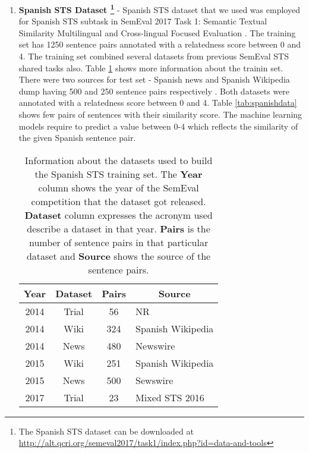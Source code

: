 \begin{enumerate}
\item{ \textbf{Spanish STS Dataset \footnote{The Spanish STS dataset can be downloaded at \url{http://alt.qcri.org/semeval2017/task1/index.php?id=data-and-tools}}}} - Spanish STS dataset that we used was employed for Spanish STS subtask in SemEval 2017 Task 1: Semantic Textual Similarity Multilingual and Cross-lingual Focused Evaluation \cite{cer-etal-2017-semeval}. The training set has 1250 sentence pairs annotated with a relatedness score between 0 and 4. The training set combined several datasets from previous SemEval STS shared tasks also\cite{cer-etal-2017-semeval}. Table \ref{tab:spanishdata_info} shows more information about the trainin set. There were two sources for test set - Spanish news and Spanish Wikipedia dump having 500 and 250 sentence pairs respectively \cite{cer-etal-2017-semeval}. Both datasets were annotated with a relatedness score between 0 and 4. Table \ref{tab:spanishdata} shows few pairs of sentences with their similarity score. The machine learning models require to predict a value between 0-4 which reflects the similarity of the given Spanish sentence pair.

\begin{table}[ht!]
	\centering
	\begin{tabular}{c|c|c|l}
		\hline
		\multicolumn{1}{c|}{\textbf{Year}} & 
		\multicolumn{1}{c|}{\textbf{Dataset}} & 
		\multicolumn{1}{c|}{\textbf{Pairs}} & 
		\multicolumn{1}{c}{\textbf{Source}} \\
		\hline
		2014 \cite{agirre-etal-2014-semeval} & Trial & 56 & NR \\
		2014 \cite{agirre-etal-2014-semeval} & Wiki  & 324 & Spanish Wikipedia \\
		2014 \cite{agirre-etal-2014-semeval} & News  & 480 & Newswire \\
		2015 \cite{agirre-etal-2014-semeval} & Wiki & 251 & Spanish Wikipedia \\
		2015 \cite{agirre-etal-2015-semeval} & News & 500 & Sewswire \\
		2017 \cite{cer-etal-2017-semeval} & Trial & 23 & Mixed STS 2016 \\
		\hline
	\end{tabular}
	\caption[Information about Spanish STS training set]{Information about the datasets used to build the Spanish STS training set. The \textbf{Year} column shows the year of the SemEval competition that the dataset got released. \textbf{Dataset} column expresses the acronym used describe a dataset in that year. \textbf{Pairs} is the number of sentence pairs in that particular dataset and \textbf{Source} shows the source of the sentence pairs. }
	\label{tab:spanishdata_info}
\end{table}



\end{enumerate}
